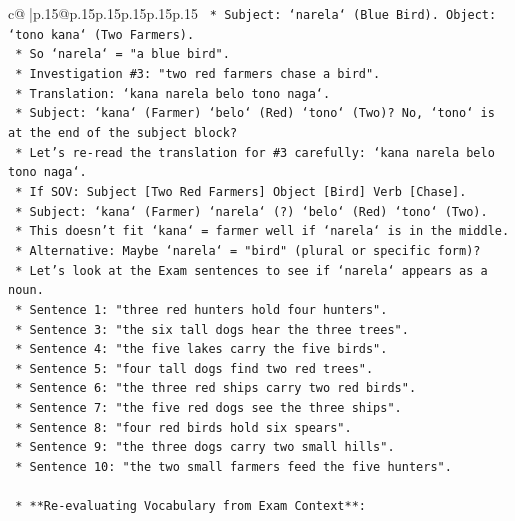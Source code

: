 \documentclass{article}
\begin{document}
{\begin{supertabular}{c@{$\;$}|p{.15\linewidth}@{}p{.15\linewidth}p{.15\linewidth}p{.15\linewidth}p{.15\linewidth}p{.15\linewidth}}
{{{\texttt{        *   Subject: `narela` (Blue Bird). Object: `tono kana` (Two Farmers).} \\
\texttt{        *   So `narela` = "a blue bird".} \\
\texttt{        *   Investigation \#3: "two red farmers chase a bird".} \\
\texttt{        *   Translation: `kana narela belo tono naga`.} \\
\texttt{        *   Subject: `kana` (Farmer) `belo` (Red) `tono` (Two)? No, `tono` is at the end of the subject block?} \\
\texttt{        *   Let's re{-}read the translation for \#3 carefully: `kana narela belo tono naga`.} \\
\texttt{        *   If SOV: Subject {[}Two Red Farmers{]} Object {[}Bird{]} Verb {[}Chase{]}.} \\
\texttt{        *   Subject: `kana` (Farmer) `narela` (?) `belo` (Red) `tono` (Two).} \\
\texttt{        *   This doesn't fit `kana` = farmer well if `narela` is in the middle.} \\
\texttt{        *   Alternative: Maybe `narela` = "bird" (plural or specific form)?} \\
\texttt{        *   Let's look at the Exam sentences to see if `narela` appears as a noun.} \\
\texttt{        *   Sentence 1: "three red hunters hold four hunters".} \\
\texttt{        *   Sentence 3: "the six tall dogs hear the three trees".} \\
\texttt{        *   Sentence 4: "the five lakes carry the five birds".} \\
\texttt{        *   Sentence 5: "four tall dogs find two red trees".} \\
\texttt{        *   Sentence 6: "the three red ships carry two red birds".} \\
\texttt{        *   Sentence 7: "the five red dogs see the three ships".} \\
\texttt{        *   Sentence 8: "four red birds hold six spears".} \\
\texttt{        *   Sentence 9: "the three dogs carry two small hills".} \\
\texttt{        *   Sentence 10: "the two small farmers feed the five hunters".} \\
\\ 
\texttt{    *   **Re{-}evaluating Vocabulary from Exam Context**:} \\
}}}
\end{supertabular}}
\end{document}
